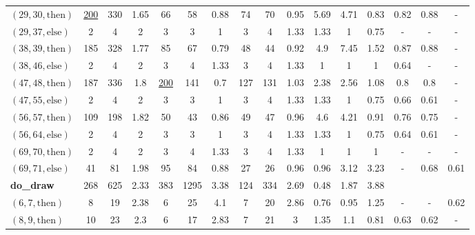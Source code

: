 \documentclass[sigconf,review]{acmart}
\newcommand{\thenBr}{\text{then}}
\newcommand{\elseBr}{\text{else}}
\newcommand{\un}[1]{\underline{#1}}
\begin{document}
\begin{table}[!t]
\begin{tabular}{l|ccc|ccc|ccc|ccc|ccc}
    $(29,30,\thenBr)$        & \un{200} & 330  & 1.65      & 66   & 58  & 0.88          & 74  & 70  & 0.95             & 5.69   & 4.71  & 0.83   & 0.82 & 0.88 & -   \\
    $(29,37,\elseBr)$        & 2        & 4    & 2         & 3    & 3   & 1             & 3   & 4   & 1.33             & 1.33   & 1     & 0.75   & - & - & -  \\
    $(38,39,\thenBr)$        & 185      & 328  & 1.77      & 85   & 67  & 0.79          & 48  & 44  & 0.92             & 4.9    & 7.45  & 1.52   & 0.87 & 0.88 & -  \\
    $(38,46,\elseBr)$        & 2        & 4    & 2         & 3    & 4   & 1.33          & 3   & 4   & 1.33             & 1      & 1     & 1      & 0.64 & - & -  \\
    $(47,48,\thenBr)$        & 187      & 336  & 1.8       & \un{200} & 141 & 0.7       & 127 & 131 & 1.03             & 2.38   & 2.56  & 1.08   & 0.8  & 0.8  & -  \\
    $(47,55,\elseBr)$        & 2        & 4    & 2         & 3    & 3   & 1             & 3   & 4   & 1.33             & 1.33   & 1     & 0.75   & 0.66 & 0.61 & -  \\
    $(56,57,\thenBr)$        & 109      & 198  & 1.82      & 50   & 43  & 0.86          & 49  & 47  & 0.96             & 4.6    & 4.21  & 0.91   & 0.76 & 0.75 & -   \\
    $(56,64,\elseBr)$        & 2        & 4    & 2         & 3    & 3   & 1             & 3   & 4   & 1.33             & 1.33   & 1     & 0.75   & 0.64 & 0.61 & -  \\
    $(69,70,\thenBr)$        & 2        & 4    & 2         & 3    & 4   & 1.33          & 3   & 4   & 1.33             & 1      & 1     & 1      & - & - & -  \\
    $(69,71,\elseBr)$        & 41       & 81   & 1.98      & 95   & 84  & 0.88          & 27  & 26  & 0.96             & 0.96   & 3.12  & 3.23   & - & 0.68 & 0.61  \\
    \hline
    \textbf{do\_draw}        & 268      & 625  & 2.33      & 383  & 1295 & 3.38         & 124 & 334 & 2.69             & 0.48   & 1.87  & 3.88   &      &      &       \\
    $(6,7,\thenBr)$          & 8        & 19   & 2.38      & 6    & 25   & 4.1          & 7   & 20  & 2.86             & 0.76   & 0.95  & 1.25   & - & -  &  0.62 \\
    $(8,9,\thenBr)$          & 10       & 23   & 2.3       & 6    & 17   & 2.83         & 7   & 21  & 3                & 1.35   & 1.1   & 0.81   & 0.63 & 0.62 &  - \\

\end{tabular}
\end{table}
\end{document}
